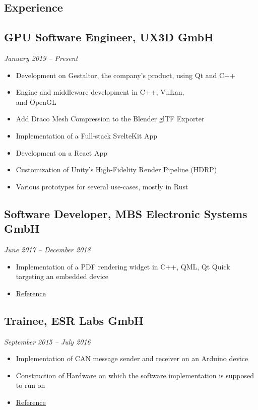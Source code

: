 \documentclass{article}
\begin{document}
\begin{paracol}{2}

\section{Experience}

\subsection{GPU Software Engineer, UX3D GmbH}
{\itshape January 2019 -- Present}

\begin{itemize}
\setlength\itemsep{0em}
\item Development on Gestaltor, the company's product, using Qt and C++
\item Engine and middleware development in C++, Vulkan,\\and OpenGL
\item Add Draco Mesh Compression to the Blender glTF Exporter
\item Implementation of a Full-stack SvelteKit App
\item Development on a React App
\item Customization of Unity's High-Fidelity Render Pipeline (HDRP)
\item Various prototypes for several use-cases, mostly in Rust
\end{itemize}

\subsection{Software Developer, MBS Electronic Systems GmbH}
{\itshape June 2017 -- December 2018}

\begin{itemize}
\setlength\itemsep{0em}
\item Implementation of a PDF rendering widget in C++, QML, Qt Quick
targeting an embedded device
\item \href{https://jimec.dev/references/mbs-Electronics-GmbH.pdf}{\underline{Reference}}
\end{itemize}

\subsection{Trainee, ESR Labs GmbH}
{\itshape September 2015 -- July 2016}

\begin{itemize}
\setlength\itemsep{0em}
\item Implementation of CAN message sender and receiver on an Arduino
device
\item Construction of Hardware on which the software implementation is
supposed to run on
\item \href{https://jimec.dev/references/ESRLabs.pdf}{\underline{Reference}}
\end{itemize}


\end{paracol}
\end{document}
